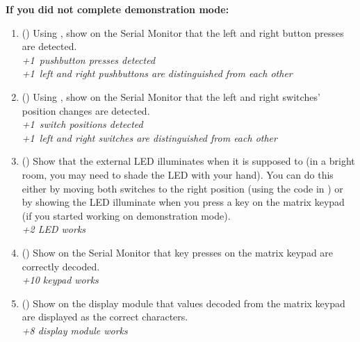 \textbf{If you did not complete demonstration mode:}
\renewcommand{\labelenumi}{\Alph{enumi}.}
\begin{enumerate}
\item (\phantom{xxx}) Using , show on the Serial
    Monitor that the left and right button presses are detected. \\
    \textit{+1\textonehalf\ pushbutton presses detected} \\
    \textit{+1\textonehalf\ left and right pushbuttons are distinguished from
    each other}
\item (\phantom{xxx}) Using , show on the Serial
    Monitor that the left and right switches' position changes are detected. \\
    \textit{+1\textonehalf\ switch positions detected} \\
    \textit{+1\textonehalf\ left and right switches are distinguished from
    each other}
\item (\phantom{xxx}) Show that the external LED illuminates when it is
    supposed to (in a bright room, you may need to shade the LED with your
    hand). You can do this either by moving both switches to the right position
    (using the code in ) or by showing the LED
    illuminate when you press a key on the matrix keypad (if you started
    working on demonstration mode). \\
    \textit{+2 LED works}
\item (\phantom{xxx}) Show on the Serial Monitor that key presses on the matrix
    keypad are correctly decoded. \\
    \textit{+10 keypad works}
\item (\phantom{xxx}) Show on the display module that values decoded from the
    matrix keypad are displayed as the correct characters. \\
    \textit{+8 display module works}
\end{enumerate}
\renewcommand{\labelenumi}{\arabic{enumi}.}
